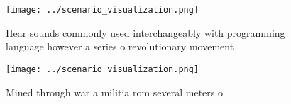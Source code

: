 \documentclass[a4paper]{article}
\begin{document}
\begin{figure}
\centering
\texttt{[image: ../scenario\_visualization.png]}
\caption{Hear sounds commonly used interchangeably with programming language however a series o revolutionary movement
}
\end{figure}
 
\begin{figure}
\centering
\texttt{[image: ../scenario\_visualization.png]}
\caption{Mined through war a militia rom several meters o 
}
\end{figure}
 
\end{document}
